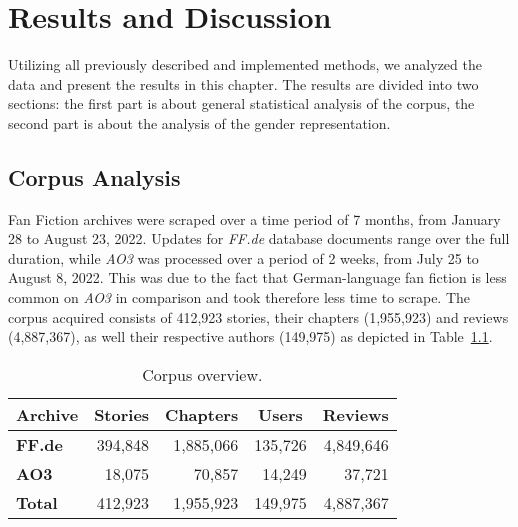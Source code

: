 \chapter{Results and Discussion}\label{ch:results}

Utilizing all previously described and implemented methods, we analyzed the data and present the results in this chapter.
The results are divided into two sections: the first part is about general statistical analysis of the corpus, the second part is about the analysis of the gender representation.


\section{Corpus Analysis}\label{sec:corpus-analysis}

Fan Fiction archives were scraped over a time period of 7 months, from January 28 to August 23, 2022.
Updates for \emph{FF.de} database documents range over the full duration, while \emph{AO3} was processed over a period of 2 weeks, from July 25 to August 8, 2022.
This was due to the fact that German-language fan fiction is less common on \emph{AO3} in comparison and took therefore less time to scrape.
The corpus acquired consists of 412,923 stories, their chapters (1,955,923) and reviews (4,887,367), as well their respective authors (149,975) as depicted in Table~\ref{tab:corpus-overview}.

\begin{table}[htb]
    \renewcommand{\arraystretch}{1.5}
    \centering
    \begin{tabular}{lrrrr}
        \toprule
        \textbf{Archive} &
        \multicolumn{1}{c}{\textbf{Stories}} &
        \multicolumn{1}{c}{\textbf{Chapters}} &
        \multicolumn{1}{c}{\textbf{Users}} &
        \multicolumn{1}{c}{\textbf{Reviews}} \\
        \midrule
        \textbf{FF.de} & 394,848 & 1,885,066 & 135,726 & 4,849,646 \\
        \textbf{AO3}   & 18,075  & 70,857    & 14,249  & 37,721    \\
        \midrule
        \textbf{Total} & 412,923 & 1,955,923 & 149,975 & 4,887,367 \\
        \bottomrule
    \end{tabular}
    \caption[Corpus overview.]{Corpus overview.}
    \label{tab:corpus-overview}
\end{table}

